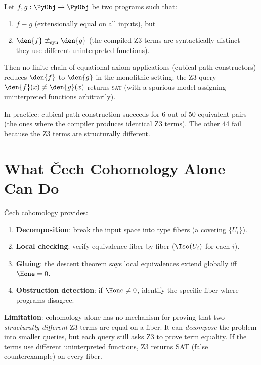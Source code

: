 \begin{proposition}
\label{prop:cubical-incomplete}
Let $f, g : \PyObj \to \PyObj$ be two programs such that:
\begin{enumerate}
  \item $f \equiv g$ (extensionally equal on all inputs), but
  \item $\den{f} \not\equiv_{\mathrm{syn}} \den{g}$ (the compiled Z3
    terms are syntactically distinct --- they use different
    uninterpreted functions).
\end{enumerate}
Then no finite chain of equational axiom applications (cubical path
constructors) reduces $\den{f}$ to $\den{g}$ in the monolithic
setting: the Z3 query $\den{f}(x) \neq \den{g}(x)$ returns
\textsc{sat} (with a spurious model assigning uninterpreted functions
arbitrarily).
\end{proposition}

In practice: cubical path construction succeeds for 6 out of 50
equivalent pairs (the ones where the compiler produces identical Z3
terms).  The other 44 fail because the Z3 terms are structurally
different.

\section{What \v{C}ech Cohomology Alone Can Do}

\v{C}ech cohomology provides:
\begin{enumerate}
  \item \textbf{Decomposition}: break the input space into type fibers
    (a covering $\{U_i\}$).
  \item \textbf{Local checking}: verify equivalence fiber by fiber
    ($\Iso(U_i)$ for each $i$).
  \item \textbf{Gluing}: the descent theorem says local equivalences
    extend globally iff $\Hone = 0$.
  \item \textbf{Obstruction detection}: if $\Hone \neq 0$, identify
    the specific fiber where programs disagree.
\end{enumerate}

\textbf{Limitation}: cohomology alone has no mechanism for proving
that two \emph{structurally different} Z3 terms are equal on a fiber.
It can \emph{decompose} the problem into smaller queries, but each
query still asks Z3 to prove term equality.  If the terms use different
uninterpreted functions, Z3 returns SAT (false counterexample) on
every fiber.

